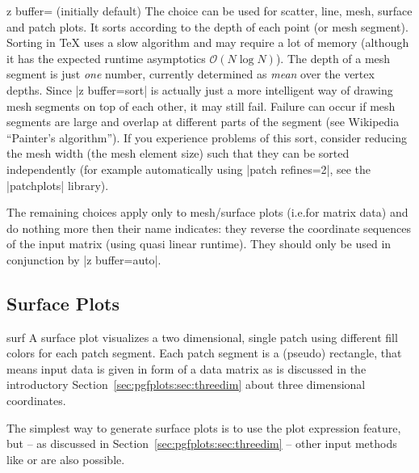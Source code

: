 {\begin{pgfplotskey}{z buffer= (initially default)%
}
    The choice  can be used for scatter, line, mesh, surface
    and patch plots. It sorts according to the depth of each point (or mesh
    segment). Sorting in \TeX{} uses a slow algorithm and may require a lot of
    memory (although it has the expected runtime asymptotics $\mathcal O(N \log
    N)$). The depth of a mesh segment is just \emph{one} number, currently
    determined as \emph{mean} over the vertex depths. Since |z buffer=sort| is
    actually just a more intelligent way of drawing mesh segments on top of
    each other, it may still fail. Failure can occur if mesh segments are large
    and overlap at different parts of the segment (see Wikipedia ``Painter's
    algorithm''). If you experience problems of this sort, consider reducing
    the mesh width (the mesh element size) such that they can be sorted
    independently (for example automatically using |patch refines=2|, see the
    |patchplots| library).

    The remaining choices apply only to mesh/surface plots (i.e.\@ for matrix
    data) and do nothing more then their name indicates: they reverse the
    coordinate sequences of the input matrix (using quasi linear runtime). They
    should only be used in conjunction by |z buffer=auto|.
\end{pgfplotskey}


\subsection{Surface Plots}
\label{sec:pgfplots:surfplots}

\begin{plottype}[/pgfplots]{surf}
    A surface plot visualizes a two dimensional, single patch using different
    fill colors for each patch segment. Each patch segment is a (pseudo)
    rectangle, that means input data is given in form of a data matrix as is
    discussed in the introductory Section~\ref{sec:pgfplots:sec:threedim} about
    three dimensional coordinates.

\pgfplotsexpensiveexample
\begin{codeexample}[]
\end{codeexample}

    The simplest way to generate surface plots is to use the plot expression
    feature, but -- as discussed in Section~\ref{sec:pgfplots:sec:threedim} --
    other input methods like  or
     are also possible.


\end{plottype}}
